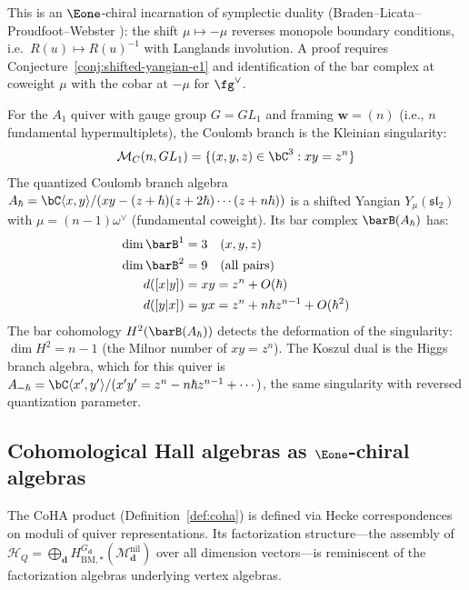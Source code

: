 \begin{remark}[Scope]
This is an $\Eone$-chiral incarnation of symplectic duality (Braden--Licata--Proudfoot--Webster \cite{BLPW16}): the shift $\mu \mapsto -\mu$ reverses monopole boundary conditions, i.e.\ $R(u) \mapsto R(u)^{-1}$ with Langlands involution.  A proof requires Conjecture~\ref{conj:shifted-yangian-e1} and identification of the bar complex at coweight $\mu$ with the cobar at $-\mu$ for $\fg^\vee$.
\end{remark}

\begin{example}
\label{ex:coulomb-a1-framing}
For the $A_1$ quiver with gauge group $G = GL_1$ and framing
$\mathbf{w} = (n)$ (i.e., $n$ fundamental hypermultiplets), the
Coulomb branch is the Kleinian singularity:
\[
\mathcal{M}_C(n, GL_1) = \{(x,y,z) \in \bC^3 : xy = z^n\}
\]
The quantized Coulomb branch algebra
$A_\hbar = \bC\langle x, y\rangle / (xy - (z+\hbar)(z+2\hbar)
\cdots (z+n\hbar))$ is a shifted Yangian $Y_\mu(\mathfrak{sl}_2)$
with $\mu = (n-1)\omega^\vee$ (fundamental coweight).  Its bar complex
$\barB(A_\hbar)$ has:
\begin{align*}
\dim \barB^1 &= 3 \quad (x, y, z) \\
\dim \barB^2 &= 9 \quad (\text{all pairs}) \\
d([x|y]) &= xy = z^n + O(\hbar) \\
d([y|x]) &= yx = z^n + n\hbar z^{n-1} + O(\hbar^2)
\end{align*}
The bar cohomology $H^2(\barB(A_\hbar))$ detects the deformation
of the singularity: $\dim H^2 = n - 1$ (the Milnor number of $xy = z^n$).
The Koszul dual is the Higgs branch algebra, which for this quiver is
$A_{-\hbar} = \bC\langle x', y'\rangle / (x'y' = z^n - n\hbar z^{n-1}
+ \cdots)$, the same singularity with reversed quantization parameter.
\end{example}

\subsection{\texorpdfstring{Cohomological Hall algebras as $\Eone$-chiral algebras}{Cohomological Hall algebras as E1-chiral algebras}}
\label{sec:coha-structure}

The CoHA product (Definition~\ref{def:coha}) is defined via Hecke
correspondences on moduli of quiver representations.  Its factorization
structure---the assembly of $\mathcal{H}_Q = \bigoplus_{\mathbf{d}}
H^{G_{\mathbf{d}}}_{\mathrm{BM},*}(\mathcal{M}_{\mathbf{d}}^{\mathrm{nil}})$
over all dimension vectors---is reminiscent of the factorization algebras
underlying vertex algebras.

